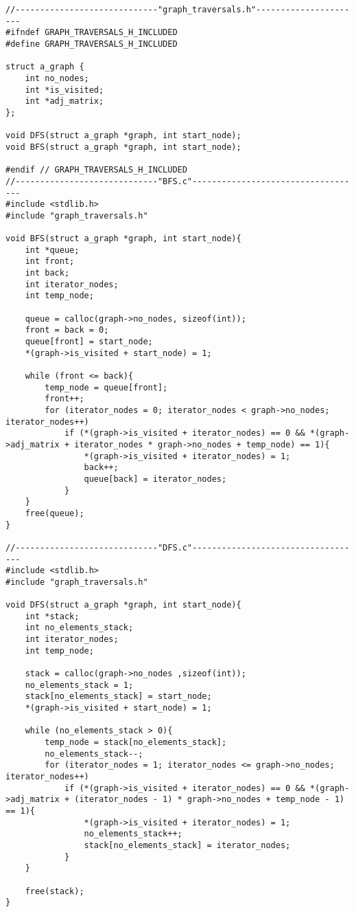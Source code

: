\documentclass[14pt]{article}
\begin{document}
\begin{lstlisting}
//-----------------------------"graph_traversals.h"----------------------
#ifndef GRAPH_TRAVERSALS_H_INCLUDED
#define GRAPH_TRAVERSALS_H_INCLUDED

struct a_graph {
    int no_nodes;
    int *is_visited;
    int *adj_matrix;
};

void DFS(struct a_graph *graph, int start_node);
void BFS(struct a_graph *graph, int start_node);

#endif // GRAPH_TRAVERSALS_H_INCLUDED
//-----------------------------"BFS.c"-----------------------------------
#include <stdlib.h>
#include "graph_traversals.h"

void BFS(struct a_graph *graph, int start_node){
    int *queue;
    int front;
    int back;
    int iterator_nodes;
    int temp_node;

    queue = calloc(graph->no_nodes, sizeof(int));
    front = back = 0;
    queue[front] = start_node;
    *(graph->is_visited + start_node) = 1;

    while (front <= back){
        temp_node = queue[front];
        front++;
        for (iterator_nodes = 0; iterator_nodes < graph->no_nodes; iterator_nodes++)
            if (*(graph->is_visited + iterator_nodes) == 0 && *(graph->adj_matrix + iterator_nodes * graph->no_nodes + temp_node) == 1){
                *(graph->is_visited + iterator_nodes) = 1;
                back++;
                queue[back] = iterator_nodes;
            }
    }
    free(queue);
}

//-----------------------------"DFS.c"-----------------------------------
#include <stdlib.h>
#include "graph_traversals.h"

void DFS(struct a_graph *graph, int start_node){
    int *stack;
    int no_elements_stack;
    int iterator_nodes;
    int temp_node;

    stack = calloc(graph->no_nodes ,sizeof(int));
    no_elements_stack = 1;
    stack[no_elements_stack] = start_node;
    *(graph->is_visited + start_node) = 1;

    while (no_elements_stack > 0){
        temp_node = stack[no_elements_stack];
        no_elements_stack--;
        for (iterator_nodes = 1; iterator_nodes <= graph->no_nodes; iterator_nodes++)
            if (*(graph->is_visited + iterator_nodes) == 0 && *(graph->adj_matrix + (iterator_nodes - 1) * graph->no_nodes + temp_node - 1) == 1){
                *(graph->is_visited + iterator_nodes) = 1;
                no_elements_stack++;
                stack[no_elements_stack] = iterator_nodes;
            }
    }

    free(stack);
}


\end{lstlisting}
\end{document}
